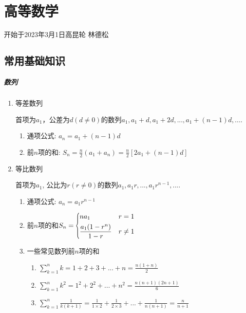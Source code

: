 
\part{高等数学}

开始于2023年3月1日高昆轮
林德松

\pagestyle{mystyle}
\chapter*{常用基础知识}

\subsubsection{数列}
\begin{enumerate}
\item 等差数列\par
首项为$ a_{1} $，公差为$ d(d\neq 0) $的数列$ a_{1},a_{1}+d,a_{1}+2d,...,a_{1}+(n-1)d,... $.
\begin{enumerate}
\item 通项公式: $ a_{n}=a_{1}+(n-1)d $
\item 前$ n $项的和: $ S_{n}=\frac{n}{2}(a_{1}+a_{n})=\frac{n}{2}[2a_{1}+(n-1)d] $
\end{enumerate}
\item 等比数列\par
首项为$ a_{1} $, 公比为$ r(r\neq 0) $的数列$ a_{1},a_{1}r,...,a_{1}r^{n-1},... $.
\begin{enumerate}
\item 通项公式: $ a_{n}=a_{1}r^{n-1} $
\item 前$ n $项的和$ S_{n}=\scaleleftright[6pt]{\biggl\{}{\begin{aligned}
& na_{1}\ & r=1 \\
& \frac{a_{1}(1-r^{n})}{1-r} & r\neq 1
\end{aligned}}{.} $
\item 一些常见数列前$ n $项的和\par
\begin{enumerate}
\item $ \sum_{k=1}^{n}k=1+2+3+...+n=\frac{n(1+n)}{2} $
\item $ \sum_{k=1}^{n}k^{2}=1^{2}+2^{2}+...+n^{2}=\frac{n(n+1)(2n+1)}{6} $
\item $ \sum_{k=1}^{n}\frac{1}{k(k+1)}=\frac{1}{1\times 2}+\frac{1}{2\times 3}+...+\frac{1}{n(n+1)}=\frac{n}{n+1} $
\end{enumerate}
\end{enumerate}
\end{enumerate}
